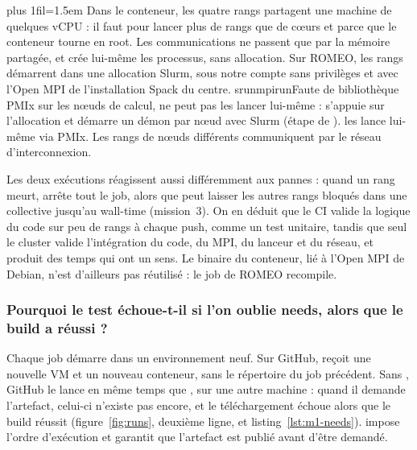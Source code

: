 \documentclass[11pt,a4paper]{article}
\makeatletter
\newcommand{\mpilauncher}{srun}
\newcommand{\lanceurmpirun}{mpirun}   %
\newcommand{\fic}[1]{\code{#1}}
\newenvironment{figtexte}{\par\medskip\noindent\begin{minipage}{\linewidth}\centering}%
  {\end{minipage}\par\medskip}
\newcommand{\commentaire}{\par\vspace{8pt}\leftskip=0pt\rightskip=0pt
  \parfillskip=0pt plus 1fil\parindent=1.5em\let\\\@normalcr}
\makeatother
\begin{document}
\begin{figtexte}
\label{fig:ci-cluster}
\commentaire
Dans le conteneur, les quatre rangs partagent une machine de quelques vCPU : il faut
 pour lancer plus de rangs que de cœurs et  parce
que le conteneur tourne en root. Les communications ne passent que par la mémoire partagée, et
 crée lui-même les processus, sans allocation. Sur ROMEO, les rangs démarrent dans
une allocation Slurm, sous notre compte sans privilèges et avec l'Open MPI de l'installation
Spack du centre. \ifx\mpilauncher\lanceurmpirun Faute de bibliothèque PMIx sur les nœuds de
calcul,  ne peut pas les lancer lui-même :  s'appuie sur l'allocation et
démarre un démon par nœud avec Slurm (étape  de ).\else {}
les lance lui-même via PMIx.\fi{} Les rangs de nœuds différents communiquent par le réseau
d'interconnexion.
\end{figtexte}

Les deux exécutions réagissent aussi différemment aux pannes : quand un rang meurt,
 arrête tout le job, alors que  peut laisser les autres rangs bloqués dans
une collective jusqu'au wall-time (mission~3). On en déduit que le CI valide la logique du code
sur peu de rangs à chaque push, comme un test unitaire, tandis que seul le cluster valide
l'intégration du code, du MPI, du lanceur et du réseau, et produit des temps qui ont un sens. Le
binaire du conteneur, lié à l'Open MPI de Debian, n'est d'ailleurs pas réutilisé : le job de
ROMEO recompile.

\subsubsection{Pourquoi le test échoue-t-il si l'on oublie needs, alors que le build a réussi ?}

Chaque job démarre dans un environnement neuf. Sur GitHub,  reçoit une nouvelle VM et
un nouveau conteneur, sans le répertoire \fic{build/} du job précédent. Sans , GitHub
le lance en même temps que , sur une autre machine : quand il demande l'artefact,
celui-ci n'existe pas encore, et le téléchargement échoue alors que le build réussit
(figure~\ref{fig:runs}, deuxième ligne, et listing~\ref{lst:m1-needs}).  impose l'ordre
d'exécution et garantit que l'artefact est publié avant d'être demandé.
\end{document}

